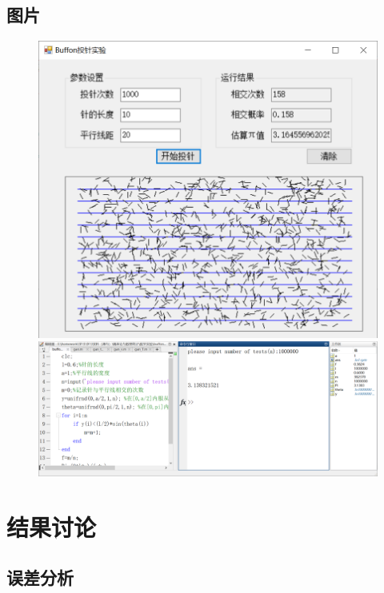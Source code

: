 \documentclass[UTF8,12pt,a4paper]{article}
\begin{document}
\subsection{图片}
\begin{figure}[!h]
	\centering
	\begin{minipage}[c]{0.45\textwidth}
		\centering
		\includegraphics[width=\linewidth]{gao1}
	\end{minipage}
	\quad
	\begin{minipage}[c]{0.45\textwidth}
		\centering
		\includegraphics[width=\linewidth]{gao2}
	\end{minipage}
\end{figure}


\section{结果讨论}
\subsection{误差分析}
\end{document}
